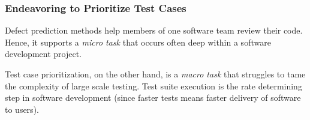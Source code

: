 \documentclass{NSF}
\newcommand{\ei}{\end{myitemize}}
\newcommand{\eq}[1]{Equation~\ref{eq:#1}}
\begin{document}
\begin{nsfdescription}




\subsubsection{Endeavoring to Prioritize Test  Cases}\label{tion:test}
Defect prediction methods help members of one software team review their code.
Hence, it supports a {\em micro task} that occurs often deep within a software development project.

Test case prioritization, on the other hand,  is a {\em macro task} that struggles to tame the complexity of large scale testing.
 Test suite execution
is the rate determining step in software development (since faster
tests means faster delivery of  software to users).



\end{nsfdescription}
\end{document}
